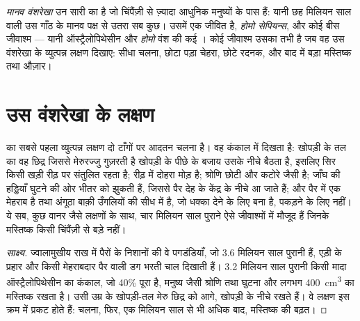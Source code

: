 \begin{definition}[मानव वंशरेखा]\label{def:g12:human-evolution:lineage}
\emph{मानव वंशरेखा} उन सारी  का  है जो
चिंपैंज़ी से ज़्यादा आधुनिक मनुष्यों के पास हैं: यानी छह मिलियन साल वाली उस
गाँठ के मानव पक्ष से उतरा सब कुछ। उसमें एक जीवित  है, \emph{होमो
सेपियन्स}, और कोई बीस जीवाश्म  --- यानी ऑस्ट्रैलोपिथेसीन और
\emph{होमो} वंश की कई । कोई जीवाश्म उसका तभी है जब वह उस वंशरेखा के
व्युत्पन्न लक्षण दिखाए: सीधा चलना, छोटा पड़ा चेहरा, छोटे रदनक, और बाद में
बड़ा मस्तिष्क तथा औज़ार।
\end{definition}

\section{उस वंशरेखा के लक्षण}

\begin{proposition}[द्विपादता पहले आई]\label{prop:g12:human-evolution:bipedalism}
 का सबसे पहला व्युत्पन्न लक्षण दो टाँगों पर आदतन चलना है। वह
कंकाल में दिखता है: खोपड़ी के तल का वह छिद्र जिससे मेरुरज्जु गुज़रती है
खोपड़ी के पीछे के बजाय उसके नीचे बैठता है, इसलिए सिर किसी खड़ी रीढ़ पर
संतुलित रहता है; रीढ़ में दोहरा मोड़ है; श्रोणि छोटी और कटोरे जैसी है; जाँघ
की हड्डियाँ घुटने की ओर भीतर को झुकती हैं, जिससे पैर देह के केंद्र के नीचे
आ जाते हैं; और पैर में एक मेहराब है तथा अंगूठा बाक़ी उँगलियों की सीध में
है, जो धक्का देने के लिए बना है, पकड़ने के लिए नहीं। ये सब, कुछ वानर जैसे
लक्षणों के साथ, चार मिलियन साल पुराने ऐसे जीवाश्मों में मौजूद हैं जिनके
मस्तिष्क किसी चिंपैंज़ी से बड़े नहीं।
\end{proposition}
\begin{proof}[साक्ष्य]
ज्वालामुखीय राख में पैरों के निशानों की वे पगडंडियाँ, जो 3.6 मिलियन साल
पुरानी हैं, एड़ी के प्रहार और किसी मेहराबदार पैर वाली डग भरती चाल दिखाती
हैं। 3.2 मिलियन साल पुरानी किसी मादा ऑस्ट्रैलोपिथेसीन का कंकाल, जो 40\%
पूरा है, मनुष्य जैसी श्रोणि तथा घुटना और लगभग \qty{400}{cm^3} का मस्तिष्क
रखता है। उसी उम्र के खोपड़ी-तल मेरु छिद्र को आगे, खोपड़ी के नीचे रखते हैं।
वे लक्षण इस क्रम में प्रकट होते हैं: चलना, फिर, एक मिलियन साल से भी अधिक
बाद, मस्तिष्क की बढ़त।
\end{proof}

